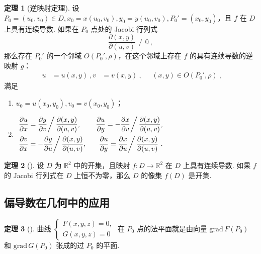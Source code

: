 \documentclass[zihao=-4,linespread=1.8,UTF8,nothm]{aytony_base}
\theoremstyle{definition}
\newtheorem{theorem}{\indent\heiti\textbf{定理}}[subsection]
\begin{document}
\begin{theorem}[逆映射定理]
    设 $P_0 = (u_0, v_0) \in D, x_0 = x(u_0, v_0), y_0 = y(u_0, v_0), P_0' = (x_0, y_0)$，且 $f$ 在 $D$ 上具有连续导数. 如果在 $P_0$ 点处的 Jacobi 行列式 $$
        \dfrac{\partial(x, y)}{\partial(u, v)} \neq 0\ ,
    $$ 那么存在 $P_0'$ 的一个邻域 $O(P_0', \rho)$，在这个邻域上存在 $f$ 的具有连续导数的逆映射 $g$：
    $$
        \begin{aligned}
            u & = u(x, y)\ ,
            v & = v(x, y)\ ,
        \end{aligned}\quad (x, y) \in O(P_0', \rho)\ ,
    $$ 满足

    \begin{enumerate}[nosep]
        \item $u_0 = u(x_0, y_0), v_0 = v(x_0, y_0)$；
        \item $\begin{aligned}
                       & \left.\dfrac{\partial u}{\partial x}  = \dfrac{\partial y}{\partial v} \right/ \dfrac{\partial(x, y)}{\partial(u, v)},\
                       & \left.\dfrac{\partial u}{\partial y}  = -\dfrac{\partial x}{\partial v} \right/ \dfrac{\partial(x, y)}{\partial(u, v)},  \\
                       & \left.\dfrac{\partial v}{\partial x}  = -\dfrac{\partial y}{\partial u} \right/ \dfrac{\partial(x, y)}{\partial(u, v)},\
                       & \left.\dfrac{\partial u}{\partial y}  = \dfrac{\partial x}{\partial u} \right/ \dfrac{\partial(x, y)}{\partial(u, v)}\ .
                  \end{aligned}$
    \end{enumerate}
\end{theorem}

\begin{theorem}[]
    设 $D$ 为 $\mathbb{R}^2$ 中的开集，且映射 $f:D \to \mathbb{R}^2$ 在 $D$ 上具有连续导数. 如果 $f$ 的 Jacobi 行列式在 $D$ 上恒不为零，那么 $D$ 的像集 $f(D)$ 是开集.
\end{theorem}

\subsection{偏导数在几何中的应用}

\begin{theorem}[]
    曲线 $\left\{
        \begin{aligned}
            F(x, y, z) = 0, \\G(x, y, z) = 0
        \end{aligned}
        \right.$ 在 $P_0$ 点的法平面就是由向量 $\mathrm{grad}\,F(P_0)$ 和 $\mathrm{grad}\,G(P_0)$ 张成的过 $P_0$ 的平面.
\end{theorem}
\end{document}
